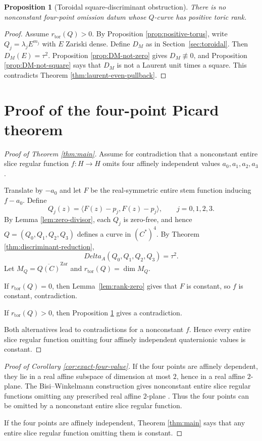 \documentclass[11pt]{amsart}
\def\HH{H}%
\def\CC{C}%
\def\DeltaA{Delta_A}%
\numberwithin{equation}{section}
\newtheorem{proposition}[theorem]{Proposition}
\theoremstyle{definition}
\theoremstyle{remark}
\newcommand{\HH}{\mathbb H}
\newcommand{\CC}{\mathbb C}
\newcommand{\DeltaA}{\Delta_A}
\newcommand{\Zar}{\mathrm{Zar}}
\newcommand{\rtor}{r_{\mathrm{tor}}}
\begin{document}
\begin{proposition}[Toroidal square-discriminant obstruction]\label{prop:toroidal-obstruction}
There is no nonconstant four-point omission datum whose $Q$-curve has positive toric rank.
\end{proposition}

\begin{proof}
Assume $\rtor(Q)>0$. By Proposition \ref{prop:positive-torus}, write $Q_j=\lambda_jE^{m_j}$ with $E$ Zariski dense. Define $D_M$ as in Section~\ref{sec:toroidal}. Then $D_M(E)=\tau^2$. Proposition \ref{prop:DM-not-zero} gives $D_M\not\equiv0$, and Proposition \ref{prop:DM-not-square} says that $D_M$ is not a Laurent unit times a square. This contradicts Theorem \ref{thm:laurent-even-pullback}.
\end{proof}

\section{Proof of the four-point Picard theorem}
\label{sec:proof}

\begin{proof}[Proof of Theorem \ref{thm:main}]
Assume for contradiction that a nonconstant entire slice regular function $f:\HH\to\HH$ omits four affinely independent values $a_0,a_1,a_2,a_3$.

Translate by $-a_0$ and let $F$ be the real-symmetric entire stem function inducing $f-a_0$. Define
\[
Q_j(z)=\langle F(z)-p_j,F(z)-p_j\rangle,
\qquad j=0,1,2,3.
\]
By Lemma \ref{lem:zero-divisor}, each $Q_j$ is zero-free, and hence $Q=(Q_0,Q_1,Q_2,Q_3)$ defines a curve in $(\CC^*)^4$. By Theorem \ref{thm:discriminant-reduction},
\[
\DeltaA(Q_0,Q_1,Q_2,Q_3)=\tau^2.
\]
Let $M_Q=\overline{Q(\CC)}^{\Zar}$ and $\rtor(Q)=\dim M_Q$.

If $\rtor(Q)=0$, then Lemma~\ref{lem:rank-zero} gives that $F$ is constant, so $f$ is constant, contradiction.

If $\rtor(Q)>0$, then Proposition \ref{prop:toroidal-obstruction} gives a contradiction.

Both alternatives lead to contradictions for a nonconstant $f$. Hence every entire slice regular function omitting four affinely independent quaternionic values is constant.
\end{proof}

\begin{proof}[Proof of Corollary \ref{cor:exact-four-value}]
If the four points are affinely dependent, they lie in a real affine subspace of dimension at most $2$, hence in a real affine $2$-plane. The Bisi--Winkelmann construction gives nonconstant entire slice regular functions omitting any prescribed real affine $2$-plane \cite{BisiWinkelmann2020QuaternionicPicard}. Thus the four points can be omitted by a nonconstant entire slice regular function.

If the four points are affinely independent, Theorem \ref{thm:main} says that any entire slice regular function omitting them is constant.
\end{proof}
\end{document}
